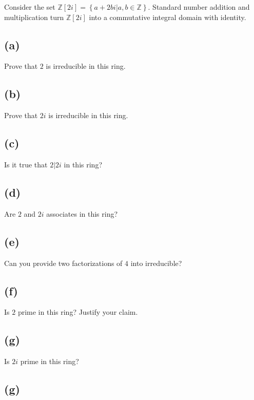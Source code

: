\documentclass[10pt]{armath}
\newcommand{\Z}{\mathbb{Z}}
\newcommand{\zi}{\mathbb{Z}\left[2i\right]}
\begin{document}
Consider the set $\zi = \left\{a+2bi\vert a,b\in\Z\right\}$. Standard number
addition and multiplication turn $\zi$ into a commutative integral domain with
identity.

\subsection*{(a)}%
\label{sub:_a_}

Prove that $2$ is irreducible in this ring.

\subsection*{(b)}%
\label{sub:_b_}

Prove that $2i$ is irreducible in this ring.


\subsection*{(c)}%
\label{sub:_c_}

Is it true that $2|2i$ in this ring?

\subsection*{(d)}%
\label{sub:_d_}

Are $2$ and $2i$ associates in this ring?

\subsection*{(e)}%
\label{sub:_e_}

Can you provide two factorizations of $4$ into irreducible?

\subsection*{(f)}%
\label{sub:_f_}

Is $2$ prime in this ring? Justify your claim.

\subsection*{(g)}%
\label{sub:_g_}

Is $2i$ prime in this ring?

\subsection*{(g)}%
\label{sub:_g_}
\end{document}
